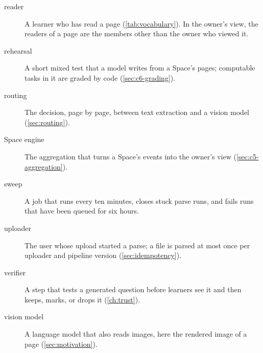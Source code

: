\begin{description}
  \item[reader] A learner who has read a page (\cref{tab:vocabulary}). In the owner's view, the readers of a page are the members
    other than the owner who viewed it.
  \item[rehearsal] A short mixed test that a model writes from a Space's
    pages; computable tasks in it are graded by code
    (\cref{sec:c6-grading}).
  \item[routing] The decision, page by page, between text extraction and a
    vision model (\cref{sec:routing}).
  \item[Space engine] The aggregation that turns a Space's events into the
    owner's view (\cref{sec:c5-aggregation}).
  \item[sweep] A job that runs every ten minutes, closes stuck parse runs,
    and fails runs that have been queued for six hours.
  \item[uploader] The user whose upload started a parse; a file is parsed at
    most once per uploader and pipeline version (\cref{sec:idempotency}).
  \item[verifier] A step that tests a generated question before learners
    see it and then keeps, marks, or drops it (\cref{ch:trust}).
  \item[vision model] A language model that also reads images, here the
    rendered image of a page (\cref{sec:motivation}).
\end{description}
